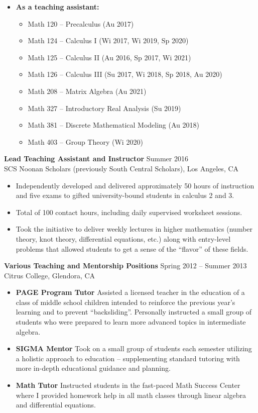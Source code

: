 \documentclass[margin]{res} %
\begin{document}
\begin{resume}
\begin{itemize}
\begin{itemize}
\end{itemize}
\item \textbf{As a teaching assistant:} 
\begin{itemize}
	\item Math 120 -- Precalculus (Au 2017)
	\item Math 124 -- Calculus I (Wi 2017, Wi 2019, Sp 2020)
	\item Math 125 -- Calculus II (Au 2016, Sp 2017, Wi 2021)
	\item Math 126 -- Calculus III (Su 2017, Wi 2018, Sp 2018, Au 2020)
	\item Math 208 -- Matrix Algebra (Au 2021)
	\item Math 327 -- Introductory Real Analysis (Su 2019)
	\item Math 381 -- Discrete Mathematical Modeling (Au 2018)
	\item Math 403 -- Group Theory (Wi 2020)
\end{itemize}
\end{itemize}
 
\pagebreak
{\bf Lead Teaching Assistant and Instructor} \hfill Summer 2016 \\
SCS Noonan Scholars (previously South Central Scholars), Los Angeles, CA
\begin{itemize} \itemsep -1pt
\item Independently developed and delivered  approximately 50 hours of instruction and five exams to gifted university-bound students in calculus 2 and 3.
\item Total of 100 contact hours, including daily supervised worksheet sessions.
\item Took the initiative to deliver weekly lectures in higher mathematics (number theory, knot theory, differential equations, etc.) along with entry-level problems that allowed students to get a sense of the “flavor” of these fields.
\end{itemize} 

{\bf Various Teaching and Mentorship Positions} \hfill Spring 2012 -- Summer 2013 \\
Citrus College, Glendora, CA
\begin{itemize} \itemsep -1pt
\item {\bf PAGE Program Tutor} Assisted a licensed teacher in the education of a class of middle school children intended to reinforce the previous year’s learning and to prevent “backsliding”. Personally instructed a small group of students who were prepared to learn more advanced topics in intermediate algebra.
\item {\bf SIGMA Mentor} Took on a small group of students each semester utilizing a holistic approach to education – supplementing standard tutoring with more in-depth educational guidance and planning.
\item {\bf Math Tutor} Instructed students in the fast-paced Math Success Center where I provided homework help in all math classes through linear algebra and differential equations.
\end{itemize} 


\end{resume}
\end{document}
